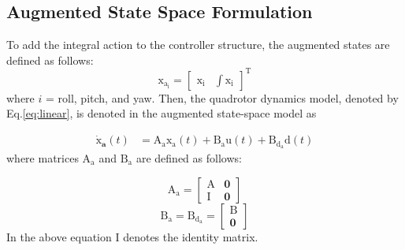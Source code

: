 \documentclass[conference]{IEEEtran}
\begin{document}
\subsection{Augmented State Space Formulation}
\noindent To add the integral action to the controller structure, the augmented states are defined as follows:
\begin{equation}\label{lqidg_x}
    \boldsymbol{\mathrm{x_{a_i}}} = \begin{bmatrix}
        \boldsymbol{\mathrm{x_i}} &
        \displaystyle \int \boldsymbol{\mathrm{x_i}}
    \end{bmatrix}^\mathrm{T}
\end{equation}
where $i$ = roll, pitch, and yaw.
Then, the quadrotor dynamics model, denoted by Eq.\eqref{eq:linear}, is denoted in the augmented state-space model as

\begin{equation}\label{systemlqidg}
	\begin{split}
		\boldsymbol{\dot{\mathrm{x}}_a}(t) &= \boldsymbol{\mathrm{A_ax_a}}(t) + \boldsymbol{\mathrm{B_{{a}}u}}(t) + \boldsymbol{\mathrm{B_{{d_a}}d}}(t)%
	\end{split}
\end{equation}
where matrices $\boldsymbol{\mathrm{A_a}}$ and $\boldsymbol{\mathrm{B_a}}$ are defined as follows:

\begin{equation}
	\boldsymbol{\mathrm{A_a}} = \begin{bmatrix}
		\boldsymbol{\mathrm{A}} & \boldsymbol{0}\\
		\boldsymbol{\mathrm{I}} & \boldsymbol{0}
	\end{bmatrix}
\end{equation}
\begin{equation}
	\boldsymbol{\mathrm{B_a}} = \boldsymbol{\mathrm{B_{{d_a}}}} = \begin{bmatrix}
		\boldsymbol{\mathrm{B}}\\
		\boldsymbol{0}
	\end{bmatrix}
\end{equation}
In the above equation $\boldsymbol{\mathrm{I}}$ denotes the identity matrix.
\end{document}
